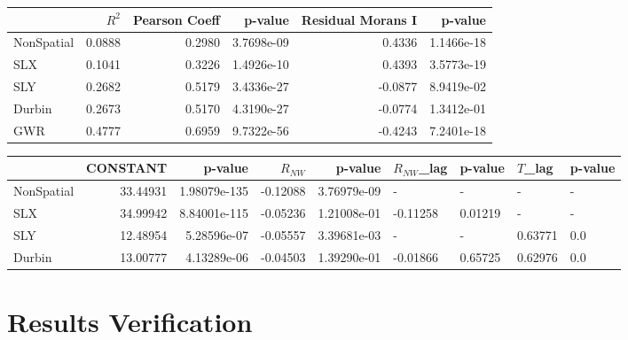 \documentclass[article,12pt]{article}
\numberwithin{equation}{section}
\begin{document}
\begin{tabular}{lrrrrr}
	\hline
	{} &     $R^2$ &  Pearson Coeff &     p-value &  Residual Morans I &     p-value \\
	\hline
	NonSpatial &  0.0888 &         0.2980 &  3.7698e-09 &             0.4336 &  1.1466e-18 \\
	SLX        &  0.1041 &         0.3226 &  1.4926e-10 &             0.4393 &  3.5773e-19 \\
	SLY        &  0.2682 &         0.5179 &  3.4336e-27 &            -0.0877 &  8.9419e-02 \\
	Durbin     &  0.2673 &         0.5170 &  4.3190e-27 &            -0.0774 &  1.3412e-01 \\
	GWR        &  0.4777 &         0.6959 &  9.7322e-56 &            -0.4243 &  7.2401e-18 \\
	\hline
\end{tabular}
\vspace{.2in}
\begin{adjustwidth}{-.55in}{}
	\begin{tabular}{lrrrrllll}
		\hline
		{} &  CONSTANT &       p-value &  $R_{NW}$ &      p-value & $R_{NW}$\_lag &  p-value & $T$\_lag & p-value \\
		\hline
		NonSpatial &  33.44931 &  1.98079e-135 &      -0.12088 &  3.76979e-09 &                - &        - &              - &       - \\
		SLX        &  34.99942 &  8.84001e-115 &      -0.05236 &  1.21008e-01 &         -0.11258 &  0.01219 &              - &       - \\
		SLY        &  12.48954 &   5.28596e-07 &      -0.05557 &  3.39681e-03 &                - &        - &        0.63771 &     0.0 \\
		Durbin     &  13.00777 &   4.13289e-06 &      -0.04503 &  1.39290e-01 &         -0.01866 &  0.65725 &        0.62976 &     0.0 \\
		\hline
	\end{tabular}
	
\end{adjustwidth}



\section*{Results Verification}
\end{document}

